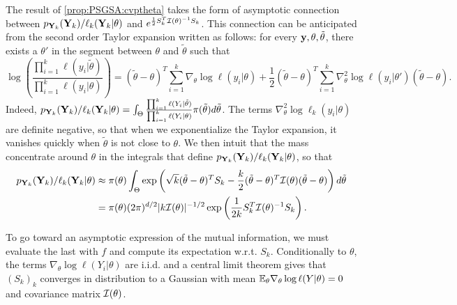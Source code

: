         The result of \cref{prop:PSGSA:cvptheta} takes the form of asymptotic connection between $p_{\mathbf{Y}_k}(\mathbf{Y}_k)/\ell_k(\mathbf{Y}_k|\theta) $ and $e^{\frac{1}{2}S_k^T\mathcal{I}(\theta)^{-1}S_k}$. This connection can be anticipated from the second order Taylor expansion written as follows: for every $\mathbf{y},\theta, \tilde\theta$, there exists a $\theta'$ in the segment between $\theta$ and $\tilde\theta$ such that
        \begin{equation}
            \log\left(\frac{\prod_{i=1}^k \ell(y_i|\tilde\theta)}{\prod_{i=1}^k \ell(y_i|\theta)}\right) = (\tilde\theta-\theta)^T\sum_{i=1}^k\nabla_\theta\log \ell(y_i|\theta) +\frac{1}{2}(\tilde\theta-\theta)^T\sum_{i=1}^k\nabla_\theta^2\log \ell(y_i|\theta')(\tilde\theta-\theta).
        \end{equation}
        Indeed, $p_{\mathbf{Y}_k}(\mathbf{Y}_k)/\ell_k(\mathbf{Y}_k|\theta) = \int_\Theta \frac{\prod_{i=1}^k \ell(Y_i|\tilde\theta)}{\prod_{i=1}^k \ell(Y_i|\theta)} \pi(\tilde\theta)d\tilde\theta$.
        The terms $\nabla_\theta^2\log\ell_k(y_i|\theta)$ are definite negative, so that when we exponentialize the Taylor expansion, it vanishes quickly when $\tilde\theta$ is not close to $\theta$.
        We then intuit that the mass concentrate around $\theta$ in the integrals that define $p_{\mathbf{Y}_k}(\mathbf{Y}_k)/\ell_k(\mathbf{Y}_k|\theta)$, so that
            \begin{equation}
                \begin{aligned}
                p_{\mathbf{Y}_k}(\mathbf{Y}_k)/\ell_k(\mathbf{Y}_k|\theta) &\approx \pi(\theta)\int_\Theta\exp\left(\sqrt{k}(\tilde\theta-\theta)^TS_k - \frac{k}{2} (\tilde\theta-\theta)^T\mathcal{I}(\theta)(\tilde\theta-\theta)  \right)d\tilde\theta\\ 
                &= \pi(\theta)(2\pi)^{d/2}|k\mathcal{I}(\theta)|^{-1/2}\exp\left(\frac{1}{2k}S_k^T\mathcal{I}(\theta)^{-1}S_k \right).
                \end{aligned}
            \end{equation} 


        To go toward an asymptotic expression of the mutual information, we must evaluate the last with $f$ and compute its expectation w.r.t. $S_k$.
        Conditionally to $\theta$, the terms $\nabla_\theta\log\ell(Y_i|\theta)$ are i.i.d. and a central limit theorem gives that $(S_k)_k$ converges in distribution to a Gaussian with mean $\mathbb{E}_{\theta}\nabla_\theta\log\ell(Y|\theta)=0$ and covariance matrix $\mathcal{I}(\theta)$.
        
